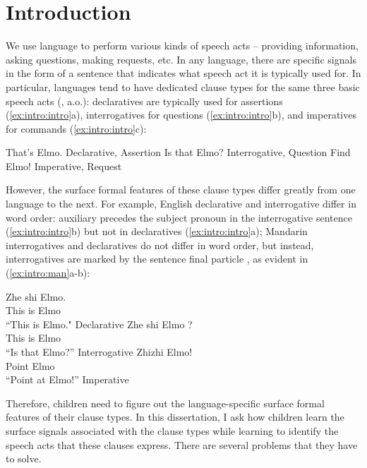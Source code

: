 

\chapter{Introduction}
\label{chap:introduction}

We use language to perform various kinds of speech acts -- providing information, asking questions, making requests, etc. In any language, there are specific signals in the form of a sentence that indicates what speech act it is typically used for. In particular, languages tend to have dedicated clause types for the same three basic speech acts (\citealt{sz1985speechact, konig2007, aikhenvald2016, portner2018}, a.o.): declaratives are typically used for assertions (\ref{ex:intro:intro}a), interrogatives for questions (\ref{ex:intro:intro}b), and imperatives for commands (\ref{ex:intro:intro}c):

\bxl
That's Elmo. \hfill Declarative, Assertion
\ex Is that Elmo? \hfill Interrogative, Question
\ex Find Elmo! \hfill Imperative, Request
\exl
\eex


However, the surface formal features of these clause types differ greatly from one language to the next. For example, English declarative and interrogative differ in word order: auxiliary  precedes the subject pronoun in the interrogative sentence (\ref{ex:intro:intro}b) but not in declaratives (\ref{ex:intro:intro}a); Mandarin interrogatives and declaratives do not differ in word order, but instead, interrogatives are marked by the sentence final particle , as evident in (\ref{ex:intro:man}a-b): 

\bxl
\gll Zhe shi Elmo.\\
This is Elmo\\
\trans ``This is Elmo." \hfill Declarative
\ex 
\gll Zhe shi Elmo ?\\
This is Elmo \Sfp\\
\trans ``Is that Elmo?'' \hfill Interrogative
\ex 
\gll Zhizhi Elmo!\\
Point Elmo\\
\trans ``Point at Elmo!'' \hfill Imperative
\exl
\eex

Therefore, children need to figure out the language-specific surface formal features of their clause types. In this dissertation, I ask how children learn the surface signals associated with the clause types while learning to identify the speech acts that these clauses express. There are several problems that they have to solve.

